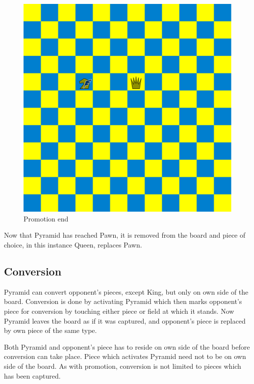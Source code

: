 \documentclass[a5paper,12pt,draft]{book} %
\begin{document}
\noindent
\begin{figure}[!h]
\includegraphics[width=1.0\textwidth, keepaspectratio=true]{../gfx/examples/06_move_pyramid_promo_end.png}
\caption{Promotion end}
\label{fig:ma_promo_end}
\end{figure}

Now that Pyramid has reached Pawn, it is removed from the board and piece of
choice, in this instance Queen, replaces Pawn.

\clearpage

\subsection*{Conversion}

Pyramid can convert opponent's pieces, except King, but only on own side of
the board. Conversion is done by activating Pyramid which then marks opponent's
piece for conversion by touching either piece or field at which it stands. Now
Pyramid leaves the board as if it was captured, and opponent's piece is replaced
by own piece of the same type.

Both Pyramid and opponent's piece has to reside on own side of the board
before conversion can take place. Piece which activates Pyramid need not
to be on own side of the board. As with promotion, conversion is not limited
to pieces which has been captured.
\end{document}

